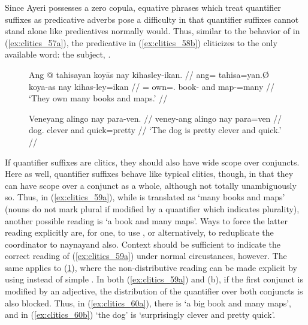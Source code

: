 Since Ayeri possesses a zero copula, equative phrases which treat quantifier
suffixes as predicative adverbs pose a difficulty in that quantifier suffixes
cannot stand alone like predicatives normally would. Thus, similar to the
behavior of  in (\ref{ex:clitics_57a}), the predicative
 in (\ref{ex:clitics_58b}) cliticizes to the only available word:
the subject, .

\begin{figure}
\pex\label{ex:clitics_59}
\a\label{ex:clitics_59a}\begingl
	\gla Ang @ tahisayan koyās nay kihasley-ikan. //
	\glb ang= tahisa=yan.Ø koya-as nay kihas-ley=ikan //
	\glc \AgtT{}= own=\TplM{}.\Top{} book-\Parg{} and map-\PargI{}=many //
	\glft `They own many books and maps.' //
\endgl

\a\label{ex:clitics_59b}\begingl
	\gla Veneyang alingo nay para-ven. //
	\glb veney-ang alingo nay para=ven //
	\glc dog.\Aarg{} clever and quick=pretty //
	\glft `The dog is pretty clever and quick.' //
\endgl
\xe
\end{figure}

If quantifier suffixes are clitics, they should also have wide scope over
conjuncts. Here as well, quantifier suffixes behave like typical clitics,
though, in that they can have scope over a conjunct as a whole, although not
totally unambiguously so. Thus, in (\ref{ex:clitics_59a}), while  is translated as `many books and
maps' (nouns do not mark plural if modified by a quantifier which indicates
plurality), another possible reading is `a book and many maps'. Ways to force
the latter reading explicitly are, for one, to use , or alternatively, to reduplicate the coordinator
 to  {naynay}{and also}. Context should be
sufficient to indicate the correct reading of (\ref{ex:clitics_59a}) under
normal circustances, however. The same applies to (\ref{ex:clitics_59b}), where
the non-distributive reading can be made explicit by using 
instead of simple . In both (\ref{ex:clitics_59a}) and (b), if
the first conjunct is modified by an adjective, the distribution of the
quantifier over both conjuncts is also blocked. Thus, in
(\ref{ex:clitics_60a}), there is `a big book and many maps', and in
(\ref{ex:clitics_60b}) `the dog' is `surprisingly clever and pretty quick'.

